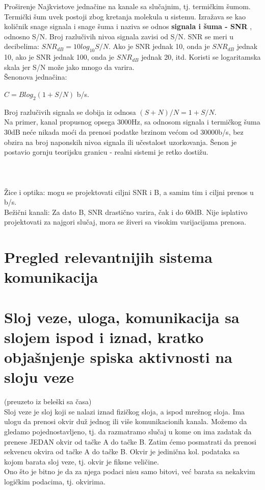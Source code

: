 \documentclass{article} %
\begin{document}
Proširenje Najkvistove jednačine na kanale sa slučajnim, tj. termičkim šumom. Termički šum uvek postoji zbog kretanja molekula u sistemu. Izražava se kao količnik snage signala i snage šuma i naziva se  odnos \textbf{signala i šuma - SNR }, odnosno S/N. Broj razlučivih nivoa signala zavisi od S/N. SNR se meri u decibelima: $ SNR_{dB} = 10 log_{10} S/N $. Ako je SNR jednak 10, onda je $SNR_{dB} $ jednak 10, ako je SNR jednak 100, onda je $ SNR_{dB} $ jednak 20, itd. Koristi se logaritamska skala jer S/N može jako mnogo da varira.\\
Šenonova jednačina:
\begin{center}
 $ C=B log_{2} (1+S/N)$  b/s.
\end{center}
Broj razlučivih signala se dobija iz odnosa $ (S+N)/N = 1+S/N $.
\\
Na primer, kanal propusnog opsega 3000Hz, sa odnosom signala i termičkog šuma 30dB neće nikada moći da prenosi podatke brzinom većom od 30000b/s, bez obzira na broj naponskih nivoa signala ili učestalost uzorkovanja. Šenon je postavio gornju teorijsku granicu - realni sistemi je retko dostižu.
\\\\\\\\
Žice i optika: mogu se projektovati ciljni SNR i B, a samim tim i ciljni prenos u b/s.\\
Bežični kanali: Za dato B, SNR drastično varira, čak i do 60dB. Nije isplativo projektovati za najgori slučaj, mora se živeri sa visokim varijacijama prenosa.

\section{Pregled relevantnijih sistema komunikacija}
\section{Sloj veze, uloga, komunikacija sa slojem ispod i iznad, kratko objašnjenje spiska aktivnosti na sloju veze}
(preuzeto iz beleški sa časa)\\

Sloj veze je sloj koji se nalazi iznad fizičkog sloja, a ispod mrežnog sloja. Ima ulogu da prenosi okvir duž jednog ili više komunikacionih kanala. Možemo da gledamo pojednostavljeno, tj. da razmatramo slučaj u kome on ima zadatak da prenese JEDAN okvir od tačke A do tačke B. Zatim ćemo posmatrati da prenosi sekvencu okvira od tačke A do tačke B. Okvir je jedinična kol. podataka sa kojom barata sloj veze, tj. okvir je fiksne veličine.\\
Ono što je bitno je da za njega podaci nisu samo bitovi, već barata sa nekakvim logičkim podacima, tj. okvirima.\\
\end{document}
